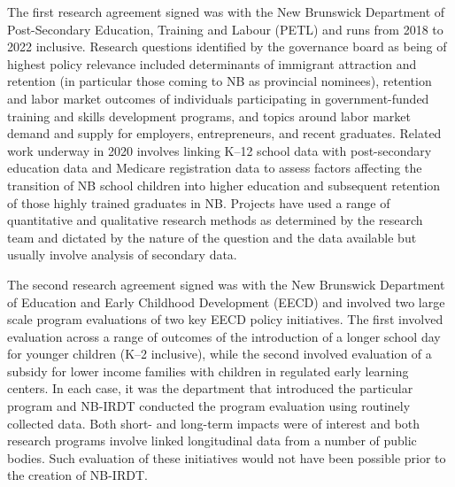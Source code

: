 \documentclass[
]{book}
\begin{document}
The first research agreement signed was with the New Brunswick Department of Post-Secondary Education, Training and Labour (PETL) and runs from 2018 to 2022 inclusive. Research questions identified by the governance board as being of highest policy relevance included determinants of immigrant attraction and retention (in particular those coming to NB as provincial nominees), retention and labor market outcomes of individuals participating in government-funded training and skills development programs, and topics around labor market demand and supply for employers, entrepreneurs, and recent graduates. Related work underway in 2020 involves linking K--12 school data with post-secondary education data and Medicare registration data to assess factors affecting the transition of NB school children into higher education and subsequent retention of those highly trained graduates in NB. Projects have used a range of quantitative and qualitative research methods as determined by the research team and dictated by the nature of the question and the data available but usually involve analysis of secondary data.

The second research agreement signed was with the New Brunswick Department of Education and Early Childhood Development (EECD) and involved two large scale program evaluations of two key EECD policy initiatives. The first involved evaluation across a range of outcomes of the introduction of a longer school day for younger children (K--2 inclusive), while the second involved evaluation of a subsidy for lower income families with children in regulated early learning centers. In each case, it was the department that introduced the particular program and NB-IRDT conducted the program evaluation using routinely collected data. Both short- and long-term impacts were of interest and both research programs involve linked longitudinal data from a number of public bodies. Such evaluation of these initiatives would not have been possible prior to the creation of NB-IRDT.
\end{document}
